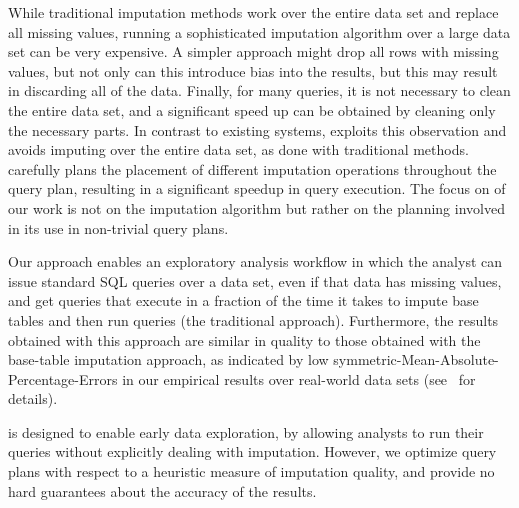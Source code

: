 While traditional imputation methods work over the entire data set and replace all missing values, running a sophisticated imputation algorithm over a large data set can be very expensive.
A simpler approach might drop all rows with missing values, but not only can this introduce bias into the results, but this may result in discarding all of the data.
Finally, for many queries, it is not necessary to clean the entire data set, and a significant speed up can be obtained by cleaning only the necessary parts.
In contrast to existing systems, \ProjectName{} exploits this observation and avoids imputing over the entire data set, as done with traditional methods. \ProjectName{}
carefully plans the placement of different imputation operations throughout the query plan, resulting in a 
significant speedup in query execution. The focus on of our work is not on the imputation algorithm but rather on the planning involved in its use in non-trivial query plans. 

Our approach enables an exploratory analysis workflow in which the analyst can issue standard SQL queries over a data set, even if that data has missing values, and get
queries that execute in a fraction of the time it takes to impute base tables and then run queries (the traditional approach). Furthermore, the results obtained with this approach
are similar in quality to those obtained with the base-table imputation approach, as indicated by low symmetric-Mean-Absolute-Percentage-Errors in our empirical results
over real-world data sets (see~ for details).

\ProjectName{} is designed to enable early data exploration, by allowing analysts to run their queries without explicitly dealing with imputation.
However, we optimize query plans with respect to a heuristic measure of imputation quality, and provide no hard guarantees about the accuracy of the results.

